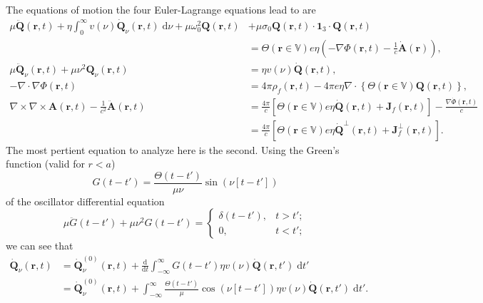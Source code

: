 The equations of motion the four Euler-Lagrange equations lead to are
\begin{equation}\label{eq:fourEOMs}
\begin{split}
\mu\ddot{\mathbf{Q}}(\mathbf{r},t) + \eta\int_0^\infty v(\nu)\dot{\mathbf{Q}}_\nu(\mathbf{r},t)\;\mathrm{d}\nu + \mu\omega_0^2\mathbf{Q}(\mathbf{r},t) &+ \mu\sigma_0\mathbf{Q}(\mathbf{r},t)\cdot\bm{1}_3\cdot\mathbf{Q}(\mathbf{r},t)\\
&= \Theta(\mathbf{r}\in\mathbb{V})e\eta\left(-\nabla\Phi(\mathbf{r},t) - \frac{1}{c}\dot{\mathbf{A}}(\mathbf{r})\right),\\[1.0em]
\mu\ddot{\mathbf{Q}}_\nu(\mathbf{r},t) + \mu\nu^2\mathbf{Q}_\nu(\mathbf{r},t) &=  \eta v(\nu)\dot{\mathbf{Q}}(\mathbf{r},t),\\[1.0em]
-\nabla\cdot\nabla\Phi(\mathbf{r},t) &= 4\pi\rho_f(\mathbf{r},t) - 4\pi e\eta\nabla\cdot\left\{\Theta(\mathbf{r}\in\mathbb{V})\mathbf{Q}(\mathbf{r},t)\right\},\\[0.5em]
\nabla\times\nabla\times\mathbf{A}(\mathbf{r},t) - \frac{1}{c^2}\ddot{\mathbf{A}}(\mathbf{r},t) &= \frac{4\pi}{c}\left[\Theta(\mathbf{r}\in\mathbb{V})e\eta\dot{\mathbf{Q}}(\mathbf{r},t) + \mathbf{J}_f(\mathbf{r},t)\right] - \frac{\nabla\dot{\Phi}(\mathbf{r},t)}{c}\\
&= \frac{4\pi}{c}\left[\Theta(\mathbf{r}\in\mathbb{V})e\eta\dot{\mathbf{Q}}^\perp(\mathbf{r},t) + \mathbf{J}_f^\perp(\mathbf{r},t)\right].
\end{split}
\end{equation}
The most pertient equation to analyze here is the second. Using the Green's function (valid for $r < a$)
\begin{equation}
G(t - t') = \frac{\Theta(t - t')}{\mu\nu}\sin(\nu[t - t'])
\end{equation}
of the oscillator differential equation
\begin{equation}
\mu\ddot{G}(t - t') + \mu\nu^2G(t - t') = 
\begin{cases}
\delta(t - t'), & t > t';\\
0, & t < t';
\end{cases}
\end{equation}
we can see that
\begin{equation}
\begin{split}
\dot{\mathbf{Q}}_\nu(\mathbf{r},t) &= \dot{\mathbf{Q}}_\nu^{(0)}(\mathbf{r},t) + \frac{\mathrm{d}}{\mathrm{d}t}\int_{-\infty}^\infty G(t - t')\eta v(\nu)\dot{\mathbf{Q}}(\mathbf{r},t')\;\mathrm{d}t'\\
&= \dot{\mathbf{Q}}_\nu^{(0)}(\mathbf{r},t) + \int_{-\infty}^\infty\frac{\Theta(t - t')}{\mu}\cos(\nu[t - t'])\eta v(\nu)\dot{\mathbf{Q}}(\mathbf{r},t')\;\mathrm{d}t'.
\end{split}
\end{equation}
